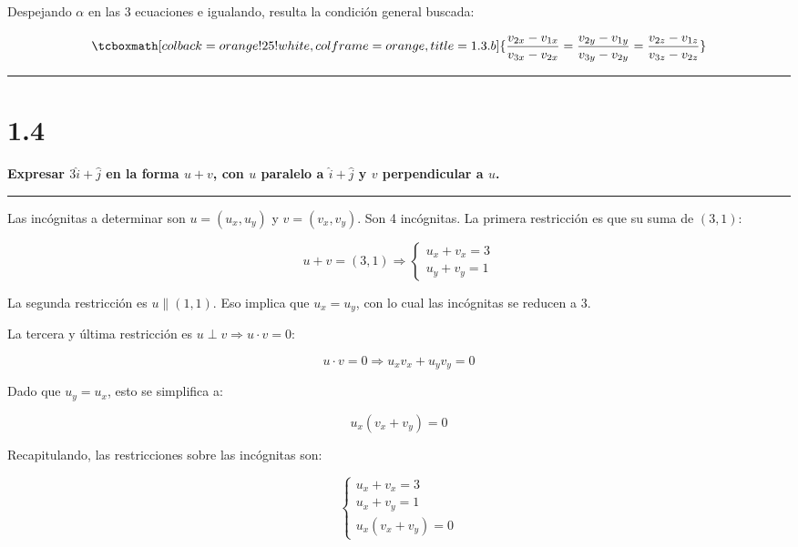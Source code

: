 \documentclass{article}
\begin{document}
Despejando $\alpha$ en las 3 ecuaciones e igualando, resulta la condición general buscada:

\begin{equation}
\tcboxmath[colback=orange!25!white,colframe=orange,title=1.3.b]
{ \frac{v_{2x} - v_{1x}}{v_{3x} - v_{2x}} = \frac{v_{2y} - v_{1y}}{v_{3y} - v_{2y}} = \frac{v_{2z} - v_{1z}}{v_{3z} - v_{2z}} }
\end{equation}

\hrule
\vspace{10 pt}

\section*{1.4}
\label{sec:1.4}

\textbf{Expresar $3 \hat{i}+\hat{j}$ en la forma $u + v$, con $u$ paralelo a $\hat{i} + \hat{j}$ y $v$ perpendicular a $u$.} 

\vspace{10 pt}
\hrule
\vspace{10 pt}

Las incógnitas a determinar son $u = (u_x, u_y)$ y $v = (v_x, v_y)$. Son 4 incógnitas. La primera restricción es que su suma de $(3, 1)$:

\begin{equation}
u + v = (3, 1) \Rightarrow \left\{ \begin{array}{ll}
u_x + v_x = 3 \\
u_y + v_y = 1
\end{array} \right.
\end{equation}

La segunda restricción es $u \parallel (1, 1)$. Eso implica que $u_x = u_y$, con lo cual las incógnitas se reducen a 3.

La tercera y última restricción es $u \perp v \Rightarrow u \cdot v = 0$:

\begin{equation}
u \cdot v = 0 \Rightarrow u_x v_x + u_y v_y = 0
\end{equation}

Dado que $u_y = u_x$, esto se simplifica a:

\begin{equation}
u_x (v_x + v_y) = 0
\end{equation}

Recapitulando, las restricciones sobre las incógnitas son:

\begin{equation}
\left\{
\begin{array}{ll}
u_x + v_x = 3 \\
u_x + v_y = 1 \\
u_x (v_x + v_y) = 0
\end{array} \right.
\end{equation}
\end{document}
